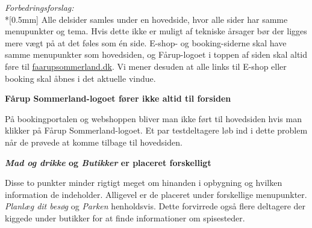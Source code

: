 \documentclass[10pt,a4paper]{article}      %
\newcommand{\kommentar}[2]{\item[#1] \textbf{#2}\par\nopagebreak}{}
\newenvironment{forslag}{\emph{Forbedringsforslag:}\\*[0.5mm]}{}
\newcommand\pic[1]{\texttt{[image: Pics/\#1]}}
\renewcommand\smallproblem{\pic{smallproblem}}
\begin{document}
\begin{kommentarer}
\begin{forslag}
Alle delsider samles under en hovedside, hvor alle sider har samme menupunkter
og tema. Hvis dette ikke er muligt af tekniske årsager bør der ligges mere vægt
på at det føles som én side. E-shop- og booking-siderne skal have samme
menupunkter som hovedsiden, og Fårup-logoet i toppen af siden skal altid føre
til \url{faarupsommerland.dk}. Vi mener desuden at alle links til E-shop eller
booking skal åbnes i det aktuelle vindue.
\end{forslag}

\kommentar{\smallproblem}{Fårup Sommerland-logoet fører ikke altid til forsiden}

På bookingportalen og webshoppen bliver man ikke ført til hovedsiden hvis man
klikker på Fårup Sommerland-logoet. Et par testdeltagere løb ind i dette problem
når de prøvede at komme tilbage til hovedsiden.

\kommentar{\smallproblem}{\emph{Mad og drikke} og \emph{Butikker} er placeret forskelligt}

Disse to punkter minder rigtigt meget om hinanden i opbygning og hvilken
information de indeholder. Alligevel er de placeret under forskellige
menupunkter. \emph{Planlæg dit besøg} og \emph{Parken} henholdsvis. Dette
forvirrede også flere deltagere der kiggede under butikker for at finde
informationer om spisesteder.

\end{kommentarer}
\end{document}
